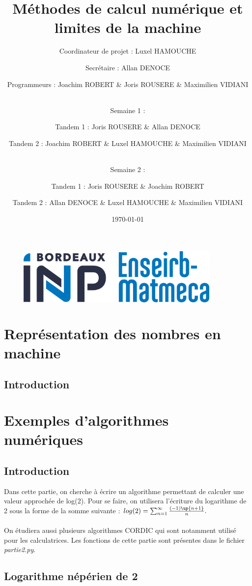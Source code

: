 \documentclass{article}
\title{Méthodes de calcul numérique et limites de la machine} %
\author{Coordinateur de projet : Luxel \textsc{HAMOUCHE} \and Secrétaire : Allan \textsc{DENOCE} \and Programmeurs : Joachim \textsc{ROBERT} \& Joris \textsc{ROUSERE} \& Maximilien \textsc{VIDIANI} \\ \\ \and Semaine 1 : \and Tandem 1 :  Joris \textsc{ROUSERE} \& Allan \textsc{DENOCE} \and Tandem 2 : Joachim \textsc{ROBERT} \& Luxel \textsc{HAMOUCHE} \& Maximilien \textsc{VIDIANI}  \\ \\ \and Semaine 2 : \and Tandem 1 :  Joris \textsc{ROUSERE} \& Joachim \textsc{ROBERT} \and Tandem 2 : Allan \textsc{DENOCE} \& Luxel \textsc{HAMOUCHE} \& Maximilien \textsc{VIDIANI}} %
\date{\today} %
\begin{document}
\maketitle


\begin{figure}[b]
    \centering
    \includegraphics[width = 10cm]{logo_enseirbmatmeca.jpg}
\end{figure}

\newpage
\tableofcontents
\newpage

\section{Représentation des nombres en machine}

\subsection{Introduction}

\section{Exemples d'algorithmes numériques}

\subsection{Introduction}

Dans cette partie, on cherche à écrire un algorithme permettant de calculer une valeur approchée de log(2). Pour se faire, on utilisera l'écriture du logarithme de 2 sous la forme de la somme suivante : 
\begin{math}
    log(2) = \sum_{n = 1}^\infty \frac{(-1)\up{n+1}}{n}.
\end{math}
\\ \\
On étudiera aussi plusieurs algorithmes CORDIC qui sont notamment utilisé pour les calculatrices. Les fonctions de cette partie sont présentes dans le fichier \emph{partie2.py}.

\subsection{Logarithme népérien de 2}
\end{document}
